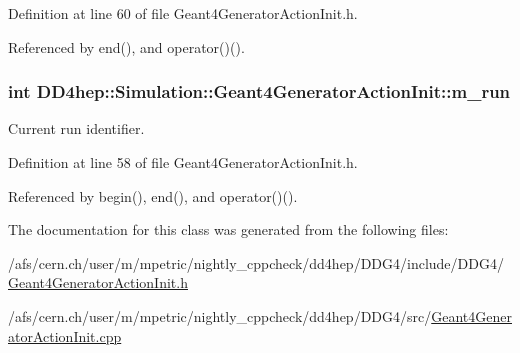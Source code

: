 Definition at line 60 of file Geant4GeneratorActionInit.h.

Referenced by end(), and operator()().\hypertarget{class_d_d4hep_1_1_simulation_1_1_geant4_generator_action_init_a251d29e869dd2401e208f39176cb6fe1}{
\subsubsection[{m\_\-run}]{\setlength{\rightskip}{0pt plus 5cm}int {\bf DD4hep::Simulation::Geant4GeneratorActionInit::m\_\-run}}}
\label{class_d_d4hep_1_1_simulation_1_1_geant4_generator_action_init_a251d29e869dd2401e208f39176cb6fe1}


Current run identifier. 

Definition at line 58 of file Geant4GeneratorActionInit.h.

Referenced by begin(), end(), and operator()().

The documentation for this class was generated from the following files:\begin{DoxyCompactItemize}
\item 
/afs/cern.ch/user/m/mpetric/nightly\_\-cppcheck/dd4hep/DDG4/include/DDG4/\hyperlink{_geant4_generator_action_init_8h}{Geant4GeneratorActionInit.h}\item 
/afs/cern.ch/user/m/mpetric/nightly\_\-cppcheck/dd4hep/DDG4/src/\hyperlink{_geant4_generator_action_init_8cpp}{Geant4GeneratorActionInit.cpp}\end{DoxyCompactItemize}
